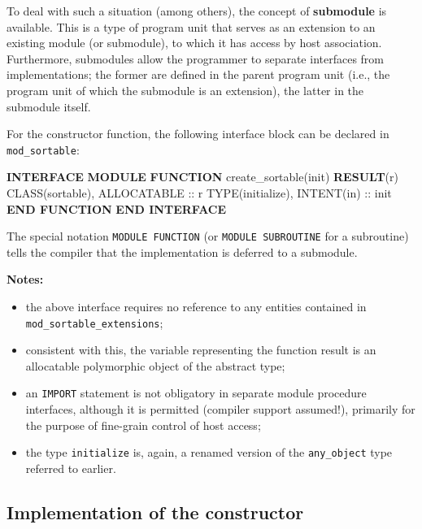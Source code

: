 \documentclass[
  paper=a4,
  ,captions=tableheading
]{scrartcl}
\newenvironment{Shaded}{\begin{snugshade}}{\end{snugshade}}
\newcommand{\DataTypeTok}[1]{\textcolor[rgb]{0.13,0.29,0.53}{#1}}
\newcommand{\KeywordTok}[1]{\textcolor[rgb]{0.13,0.29,0.53}{\textbf{#1}}}
\newcommand{\NormalTok}[1]{#1}
\providecommand{\tightlist}{%
  \setlength{\itemsep}{0pt}\setlength{\parskip}{0pt}}
\begin{document}
To deal with such a situation (among others), the concept of
\textbf{submodule} is available. This is a type of program unit that
serves as an extension to an existing module (or submodule), to which it
has access by host association. Furthermore, submodules allow the
programmer to separate interfaces from implementations; the former are
defined in the parent program unit (i.e., the program unit of which the
submodule is an extension), the latter in the submodule itself.

For the constructor function, the following interface block can be
declared in \texttt{mod\_sortable}:

\begin{Shaded}
\begin{Highlighting}[]
\KeywordTok{INTERFACE}
   \KeywordTok{MODULE} \KeywordTok{FUNCTION}\NormalTok{ create\_sortable(init) }\KeywordTok{RESULT}\NormalTok{(r)}
      \DataTypeTok{CLASS(sortable)}\NormalTok{, }\DataTypeTok{ALLOCATABLE} \DataTypeTok{::}\NormalTok{ r}
      \DataTypeTok{TYPE(initialize)}\NormalTok{, }\DataTypeTok{INTENT(in)} \DataTypeTok{::}\NormalTok{ init}
   \KeywordTok{END FUNCTION}
\KeywordTok{END INTERFACE}
\end{Highlighting}
\end{Shaded}

The special notation \texttt{MODULE\ FUNCTION} (or
\texttt{MODULE\ SUBROUTINE} for a subroutine) tells the compiler that
the implementation is deferred to a submodule.

\textbf{Notes:}

\begin{itemize}
\tightlist
\item
  the above interface requires no reference to any entities contained in
  \texttt{mod\_sortable\_extensions};
\item
  consistent with this, the variable representing the function result is
  an allocatable polymorphic object of the abstract type;
\item
  an \texttt{IMPORT} statement is not obligatory in separate module
  procedure interfaces, although it is permitted (compiler support
  assumed!), primarily for the purpose of fine-grain control of host
  access;
\item
  the type \texttt{initialize} is, again, a renamed version of the
  \texttt{any\_object} type referred to earlier.
\end{itemize}

\subsection{Implementation of the
constructor}\label{implementation-of-the-constructor}
\end{document}
